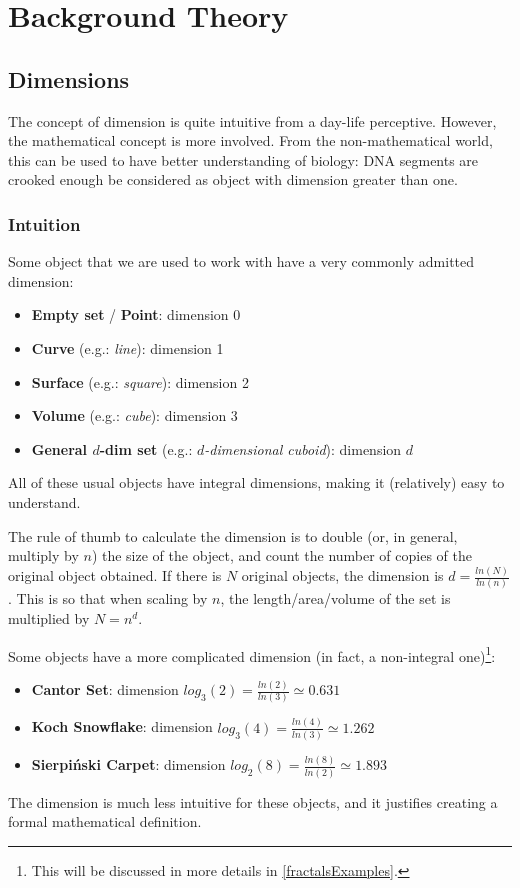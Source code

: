 \section{Background Theory}


\subsection{Dimensions}
The concept of dimension is quite intuitive from a day-life perceptive.
However, the mathematical concept is more involved.
From the non-mathematical world, this can be used to have better understanding of biology: DNA segments are crooked enough be considered as object with dimension greater than one.

\subsubsection{Intuition}
Some object that we are used to work with have a very commonly admitted dimension:
\begin{itemize}
	\item \textbf{Empty set} / \textbf{Point}: dimension 0
	\item \textbf{Curve} (e.g.: \textit{line}): dimension 1
	\item \textbf{Surface} (e.g.: \textit{square}): dimension 2
	\item \textbf{Volume} (e.g.: \textit{cube}): dimension 3
	\item \textbf{General $d$-dim set} (e.g.: \textit{$d$-dimensional cuboid}): dimension $d$
\end{itemize}
All of these usual objects have integral dimensions, making it (relatively) easy to understand.

The rule of thumb to calculate the dimension is to double (or, in general, multiply by $n$) the size of the object, and count the number of copies of the original object obtained.
If there is $N$ original objects, the dimension is $d = \frac{ln(N)}{ln(n)}$.
This is so that when scaling by $n$, the length/area/volume of the set is multiplied by $N = n^d$.

Some objects have a more complicated dimension (in fact, a non-integral one)\footnote{This will be discussed in more details in \ref{fractalsExamples}.}:
\begin{itemize}
	\item \textbf{Cantor Set}: dimension $log_3(2) = \frac{ln(2)}{ln(3)} \simeq 0.631$
	\item \textbf{Koch Snowflake}: dimension $log_3(4) = \frac{ln(4)}{ln(3)} \simeq 1.262$
	\item \textbf{Sierpiński Carpet}: dimension $log_2(8) = \frac{ln(8)}{ln(2)} \simeq 1.893$
\end{itemize}
The dimension is much less intuitive for these objects, and it justifies creating a formal mathematical definition.

